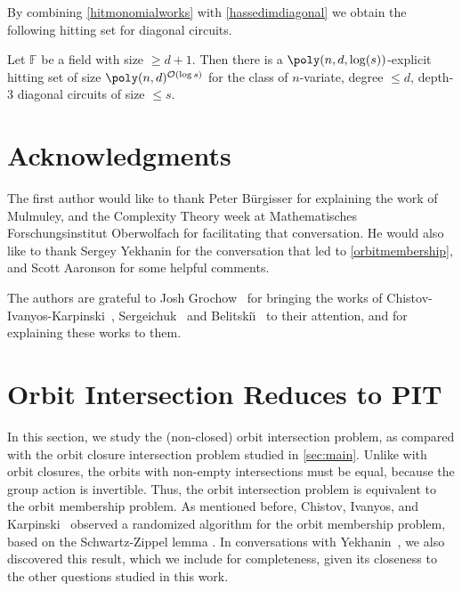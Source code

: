 \documentclass[letterpaper,11pt]{article}
\numberwithin{equation}{section}
\theoremstyle{plain}
\theoremstyle{remark}
\newcommand{\F}{\mathbb{F}}
\renewcommand{\O}{\mathcal{O}}
\begin{document}
By combining \autoref{hitmonomialworks} with \autoref{hassedimdiagonal} we obtain the following hitting set for diagonal circuits.

\begin{corollary}
	\label{diagonalpit}
	Let $\F$ be a field with size $\ge d+1$. Then there is a $\poly(n,d,\log(s))$-explicit hitting set of size $\poly(n,d)^{\O(\log s)}$ for the class of $n$-variate, degree $\le d$, depth-3 diagonal circuits of size $\le s$.
\end{corollary}


\section{Acknowledgments}

The first author would like to thank Peter B\"{u}rgisser for explaining the work of Mulmuley, and the Complexity Theory week at Mathematisches Forschungsinstitut Oberwolfach for facilitating that conversation. He would also like to thank Sergey Yekhanin for the conversation that led to \autoref{orbitmembership}, and Scott Aaronson for some helpful comments.

The authors are grateful to Josh Grochow~\cite{Grochow13} for bringing the works of Chistov-Ivanyos-Karpinski~\cite{ChistovIK97}, Sergeichuk~\cite{Sergeichuk2000} and Belitski{\u \i}~\cite{belitskii1983} to their attention, and for explaining these works to them. 




\appendix

\section{Orbit Intersection Reduces to PIT}\label{sec:orbitmem}

In this section, we study the (non-closed) orbit intersection problem, as compared with the orbit closure intersection problem studied in \autoref{sec:main}.  Unlike with orbit closures, the orbits with non-empty intersections must be equal, because the group action is invertible.  Thus, the orbit intersection problem is equivalent to the orbit membership problem. As mentioned before, Chistov, Ivanyos, and  Karpinski~\cite{ChistovIK97} observed a randomized algorithm for the orbit membership problem, based on the Schwartz-Zippel lemma \cite{Schwartz80,Zippel79}. In conversations with Yekhanin~\cite{Yekhanin2013}, we also discovered this result, which we include for completeness, given its closeness to the other questions studied in this work.
\end{document}
